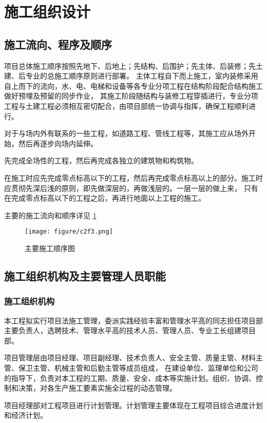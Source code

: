 \section{施工组织设计}
\subsection{施工流向、程序及顺序}


项目总体施工顺序按照先地下、后地上；先结构、后围护；先主体、后装修；先土建、后专业的总施工顺序原则进行部署。
主体工程自下而上施工，室内装修采用自上而下的流向，水、电、电梯和设备等各专业分项工程在结构阶段配合结构施工做好预埋及预留的同步作业，
其施工阶段随结构与装修工程穿插进行，专业分项工程与土建工程必须相互密切配合，由项目部统一协调与指挥，确保工程顺利进行。

对于与场内外有联系的一些工程，如道路工程、管线工程等，其施工应从场外开始，然后再逐步向场内延伸。

先完成全场性的工程，然后再完成各独立的建筑物和构筑物。

在施工时应先完成零点标高以下的工程，然后再完成零点标高以上的部分。施工时应贯彻先深后浅的原则，即先做深层的，再做浅层的。一层一层的做上来，
只有在完成零点标高以下的工程之后，再进行地面以上工程的施工。

主要的施工流向和顺序详见 \ref{fig:c2f3}

\begin{figure}[thbp!]
    \centering
    \texttt{[image: figure/c2f3.png]}
    \caption{主要施工顺序图}
    \label{fig:c2f3}
\end{figure}

\subsection{施工组织机构及主要管理人员职能}
\subsubsection{施工组织机构}

本工程拟实行项目法施工管理，委派实践经验丰富和管理水平高的同志担任项目部主要负责人，选聘技术、管理水平高的技术人员、管理人员、专业工长组建项目部。

项目管理层由项目经理、项目副经理、技术负责人、安全主管、质量主管、材料主管、保卫主管、机械主管和后勤主管等成员组成，
在建设单位、监理单位和公司的指导下，负责对本工程的工期、质量、安全、成本等实施计划。组织、协调、控制和决策，对各生产施工要素实施全过程的动态管理。

项目经理部对工程项目进行计划管理。计划管理主要体现在工程项目综合进度计划和经济计划。


